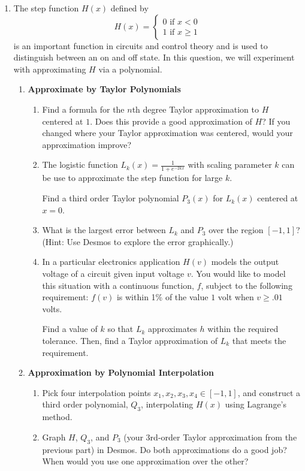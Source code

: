 \begin{enumerate}
	\item The step function $H(x)$  defined by
	      \[
		      H(x) = \begin{cases}
			      0  \text{ if } x < 0 \\
			      1 \text { if } x \geq 1
		      \end{cases}
	      \]
	      is an important function in circuits and control theory
	      and is used to distinguish between an on and off state.
		  In this question, we will experiment with approximating $H$ via a polynomial.
	      \begin{enumerate}
		      \item \textbf{Approximate by Taylor Polynomials}
		            \begin{enumerate}
						\item Find a formula for the $n$th degree Taylor approximation to $H$ centered 
						at $1$. Does this provide a good approximation of $H$? If you changed where your
						Taylor approximation was centered, would your approximation improve?
			            \item The logistic function $L_k(x) = \frac{1}{1+e^{-2kx}}$ with scaling parameter $k$ 
						can be use to approximate the step function for large $k$.
						
						Find a third order Taylor polynomial $P_3(x)$ for $L_k(x)$ centered at $x=0$.
			            \item What is the largest error between 
						$L_k$ and $P_3$ over the region $[-1,1]$? (Hint: Use Desmos to explore the error graphically.)

						\item In a particular electronics application $H(v)$ models the output 
						voltage of a circuit given input voltage $v$. You would like to model 
						this situation with a continuous function, $f$, subject to the following requirement:
						$f(v)$ is within 1\% of the value $1$ volt when $v\geq .01$ volts.

						Find a value of $k$ so that $L_k$ approximates $h$ within the required tolerance.
						Then, find a Taylor approximation of $L_k$ that meets the requirement.
		            \end{enumerate}


		      \item \textbf{Approximation by Polynomial Interpolation}

		            \begin{enumerate}
			            \item Pick four interpolation points $x_1,x_2,x_3,x_4 \in [-1,1]$, and construct a third order polynomial, $Q_3$, interpolating $H(x)$ using Lagrange's method.
			            \item Graph $H$, $Q_3$, and $P_3$ (your 3rd-order Taylor approximation from the previous part) in Desmos.
						Do both approximations do a good job? When would you use one approximation over the other?
		            \end{enumerate}


\end{enumerate}
\end{enumerate}
